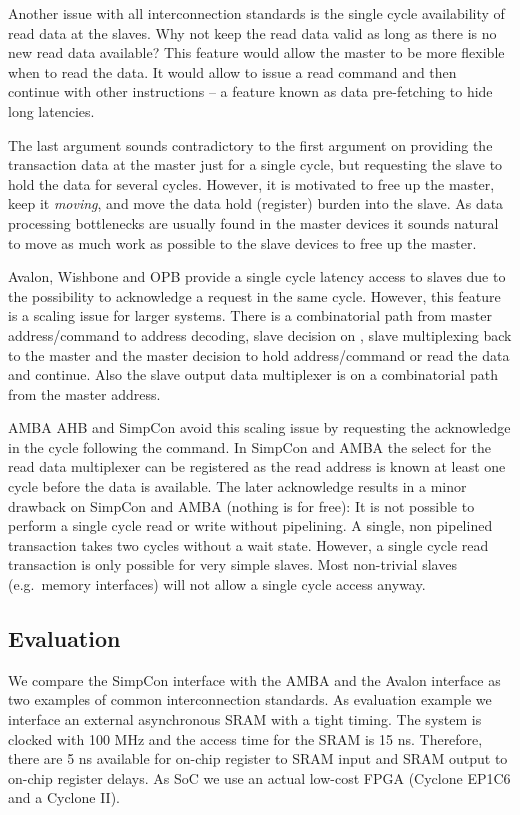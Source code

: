 Another issue with all interconnection standards is the single cycle
availability of read data at the slaves. Why not keep the read data
valid as long as there is no new read data available? This feature
would allow the master to be more flexible when to read the data. It
would allow to issue a read command and then continue with other
instructions -- a feature known as data pre-fetching to hide long
latencies.

The last argument sounds contradictory to the first argument on
providing the transaction data at the master just for a single
cycle, but requesting the slave to hold the data for several cycles.
However, it is motivated to free up the master, keep it
\emph{moving}, and move the data hold (register) burden into the
slave. As data processing bottlenecks are usually found in the
master devices it sounds natural to move as much work as possible to
the slave devices to free up the master.

Avalon, Wishbone and OPB provide a single cycle latency access to
slaves due to the possibility to acknowledge a request in the same
cycle. However, this feature is a scaling issue for larger systems.
There is a combinatorial path from master address/command to address
decoding, slave decision on , slave 
multiplexing back to the master and the master decision to hold
address/command or read the data and continue. Also the slave output
data multiplexer is on a combinatorial path from the master address.

AMBA AHB and SimpCon avoid this scaling issue by requesting the
acknowledge in the cycle following the command. In SimpCon and AMBA
the select for the read data multiplexer can be registered as the
read address is known at least one cycle before the data is
available. The later acknowledge results in a minor drawback on
SimpCon and AMBA (nothing is for free): It is not possible to
perform a single cycle read or write without pipelining. A single,
non pipelined transaction takes two cycles without a wait state.
However, a single cycle read transaction is only possible for very
simple slaves. Most non-trivial slaves (e.g.\ memory interfaces)
will not allow a single cycle access anyway.

\subsection{Evaluation}

We compare the SimpCon interface with the AMBA and the Avalon
interface as two examples of common interconnection standards. As
evaluation example we interface an external asynchronous SRAM with a
tight timing. The system is clocked with 100 MHz and the access time
for the SRAM is 15 ns. Therefore, there are 5 ns available for
on-chip register to SRAM input and SRAM output to on-chip register
delays. As SoC we use an actual low-cost FPGA (Cyclone EP1C6
\cite{AltCyc} and a Cyclone II).

